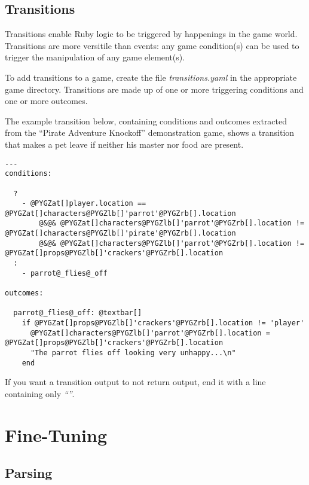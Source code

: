 \documentclass[letterpaper,10pt,english]{manual}
\begin{document}
\section{Transitions}

Transitions enable Ruby logic to be triggered by happenings in the game world. Transitions are more versitile than events: any game condition(s) can be used to trigger the manipulation of any game element(s).

To add transitions to a game, create the file \emph{transitions.yaml} in the appropriate game directory. Transitions are made up of one or more triggering conditions and one or more outcomes.

The example transition below, containing conditions and outcomes extracted from the ``Pirate Adventure Knockoff'' demonstration game, shows a transition that makes a pet leave if neither his master nor food are present.

\begin{Verbatim}[commandchars=@\[\]]
---
conditions:

  ?
    - @PYGZat[]player.location == @PYGZat[]characters@PYGZlb[]'parrot'@PYGZrb[].location
        @&@& @PYGZat[]characters@PYGZlb[]'parrot'@PYGZrb[].location != @PYGZat[]characters@PYGZlb[]'pirate'@PYGZrb[].location
        @&@& @PYGZat[]characters@PYGZlb[]'parrot'@PYGZrb[].location != @PYGZat[]props@PYGZlb[]'crackers'@PYGZrb[].location
  :
    - parrot@_flies@_off

outcomes:

  parrot@_flies@_off: @textbar[]
    if @PYGZat[]props@PYGZlb[]'crackers'@PYGZrb[].location != 'player'
      @PYGZat[]characters@PYGZlb[]'parrot'@PYGZrb[].location = @PYGZat[]props@PYGZlb[]'crackers'@PYGZrb[].location
      "The parrot flies off looking very unhappy...\n"
    end
\end{Verbatim}

If you want a transition output to not return output, end it with a line containing only \emph{``''}.

\resetcurrentobjects
\hypertarget{--doc-fine_tuning}{}

\chapter{Fine-Tuning}


\section{Parsing}
\end{document}
